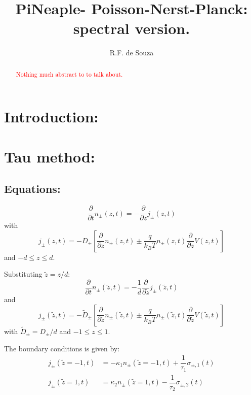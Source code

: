 \documentclass[amsmath,amsfonts,amssymb,superscriptaddress,showkeys,notitlepage,onecolumn]{revtex4-1}
\newcommand{\tred}[1]{ \textcolor{red}{#1} }
\newcommand{\dpartial}[1]{\ensuremath{\dfrac{\partial}{\partial #1}}}
\newcommand{\Npm}{\ensuremath{n_{\pm}(z,t)}}
\newcommand{\jpm}{\ensuremath{j_{\pm}(z,t)}}
\begin{document}
\title{PiNeaple- Poisson-Nerst-Planck: spectral version.}

\author{R.F. de Souza}

\begin{abstract} \tred{ Nothing much abstract to to talk about.} 
\end{abstract}

\maketitle

\section{Introduction:}



\section{Tau method:}

\subsection{Equations:}
\begin{equation}
  \dfrac{\partial}{\partial t}\Npm= -\dpartial{z} \jpm
\end{equation}
with
\begin{equation}\label{eq:StrongFlux}
  j_{\pm}(z,t)=-D_{\pm}\left[\dpartial{z} \Npm \pm \dfrac{q}{k_B T} \Npm \dpartial{z} V(z,t) \right] 
\end{equation}
and $-d \leq z \leq d$.

  \renewcommand{\Npm}{\ensuremath{n_{\pm}(\tilde{z},t)}}
  \renewcommand{\jpm}{\ensuremath{j_{\pm}(\tilde{z},t)}}

  
  Substituting $\tilde{z}=z/d$:
  \begin{equation}\label{eq:StrongPotential}
  \dfrac{\partial}{\partial t}\Npm= -\dfrac{1}{d}\dpartial{\tilde{z}} \jpm
\end{equation}
and  
\begin{equation}
  \jpm=-\tilde{D}_\pm\left[\dpartial{\tilde{z}}\Npm \pm \dfrac{q}{k_B T} \Npm \dpartial{\tilde{z}} V(\tilde{z},t) \right]
\end{equation}
with $\tilde{D}_\pm =D_\pm/d$ and $-1\leq z \leq 1$.

The boundary conditions is given by:
\begin{align}\nonumber
  j_{\pm}(\tilde{z}=-1,t)&=-\kappa_1 n_{\pm}(\tilde{z}=-1,t) + \dfrac{1}{\tau_1}\sigma_{\pm,1}(t)\\
  j_{\pm}(\tilde{z}=1,t)&=\kappa_2 n_{\pm}(\tilde{z}=1,t) -\dfrac{1}{\tau_2}\sigma_{\pm,2}(t)
\end{align}
\end{document}
